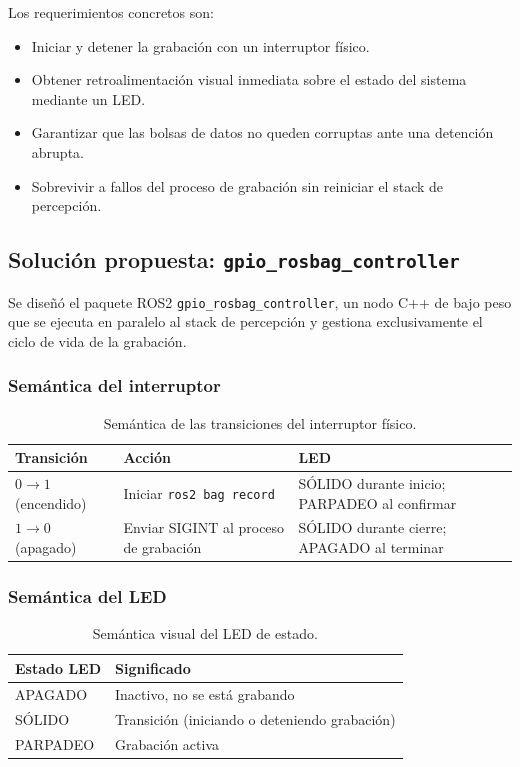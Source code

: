 Los requerimientos concretos son:
\begin{itemize}
  \item Iniciar y detener la grabación con un interruptor físico.
  \item Obtener retroalimentación visual inmediata sobre el estado del sistema
        mediante un LED.
  \item Garantizar que las bolsas de datos no queden corruptas ante una
        detención abrupta.
  \item Sobrevivir a fallos del proceso de grabación sin reiniciar el stack
        de percepción.
\end{itemize}

\subsection{Solución propuesta: \texttt{gpio\_rosbag\_controller}}
\label{sec:gpio-rosbag-solution}

Se diseñó el paquete ROS2 \texttt{gpio\_rosbag\_controller}, un nodo C++ de
bajo peso que se ejecuta en paralelo al stack de percepción y gestiona
exclusivamente el ciclo de vida de la grabación.

\subsubsection{Semántica del interruptor}

\begin{table}[H]
\centering
\begin{tabular}{lll}
\toprule
\textbf{Transición} & \textbf{Acción} & \textbf{LED} \\
\midrule
$0 \to 1$ (encendido) & Iniciar \texttt{ros2 bag record}   & SÓLIDO durante inicio; PARPADEO al confirmar \\
$1 \to 0$ (apagado)   & Enviar SIGINT al proceso de grabación & SÓLIDO durante cierre; APAGADO al terminar \\
\bottomrule
\end{tabular}
\caption{Semántica de las transiciones del interruptor físico.}
\label{tab:switch-semantics}
\end{table}

\subsubsection{Semántica del LED}

\begin{table}[H]
\centering
\begin{tabular}{ll}
\toprule
\textbf{Estado LED}  & \textbf{Significado} \\
\midrule
APAGADO  & Inactivo,  no se está grabando \\
SÓLIDO   & Transición (iniciando o deteniendo grabación) \\
PARPADEO & Grabación activa \\
\bottomrule
\end{tabular}
\caption{Semántica visual del LED de estado.}
\label{tab:led-semantics}
\end{table}

